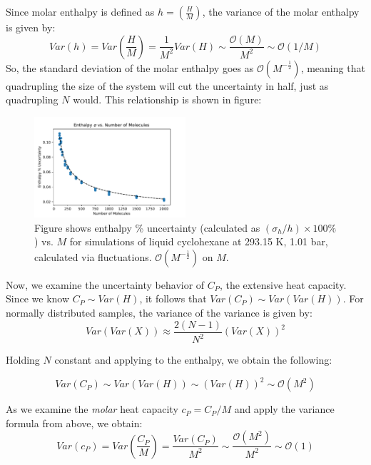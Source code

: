 \documentclass[9pt,bestpractices]{livecoms}
\begin{document}
Since molar enthalpy is defined as $h=\left(\frac{H}{M}\right)$, the variance of the molar enthalpy is given by:
\begin{equation}
Var(h) = Var\left(\frac{H}{M}\right) = \frac{1}{M^2} Var(H) \sim \frac{\mathcal{O}(M)}{M^2} \sim \mathcal{O} (1/M)
\end{equation}
So, the standard deviation of the molar enthalpy goes as $\mathcal{O} (M^{-\frac{1}{2}})$, meaning that quadrupling the size of the system will cut the uncertainty in half, just as quadrupling $N$ would.  This relationship is shown in figure:

\begin{figure}[H]
\includegraphics[width=0.5\textwidth]{enthalpy_stdev_vs_number_of_molecules.pdf}
\caption{Figure shows enthalpy \% uncertainty (calculated as $(\sigma_{h}/h) \times 100 \%$) vs. $M$ for simulations of liquid cyclohexane at 293.15 K, 1.01 bar, calculated via fluctuations. $\mathcal{O} (M^{-\frac{1}{2}})$ on $M$.}
\end{figure}

Now, we examine the uncertainty behavior of $C_P$, the extensive heat capacity.  Since we know $C_P \sim Var(H)$, it follows that $ Var(C_P) \sim Var(Var(H)) $.  For normally distributed samples, the variance of the variance is given by:
\begin{equation}
Var(Var(X)) \approx \frac{2(N-1)}{N^2} (Var(X))^2
\end{equation}

Holding $N$ constant and applying to the enthalpy, we obtain the following:

\begin{equation}
Var(C_P) \sim Var(Var(H)) \sim (Var(H))^2 \sim \mathcal{O}(M^2)
\end{equation}

As we examine the \emph{molar} heat capacity $c_P=C_P/M$ and apply the variance formula from above, we obtain:
\begin{equation}
Var(c_P) = Var(\frac{C_P}{M}) = \frac{Var(C_P)}{M^2}  \sim \frac{\mathcal{O}(M^2)}{M^2} \sim \mathcal{O}(1)
\end{equation}
\end{document}
